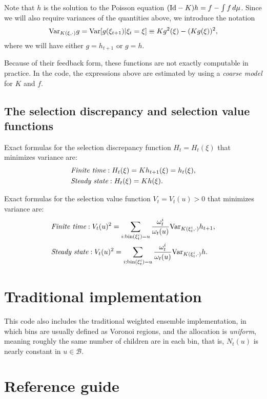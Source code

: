 \documentclass[11pt,letterpaper]{amsart}
\theoremstyle{plain}
\theoremstyle{definition}
\numberwithin{equation}{section}
\begin{document}
Note 
that $h$ is the solution to the Poisson equation $(\textup{Id} -K)h = f - \int f\,d\mu$. Since we 
will also require variances of the quantities above, we 
introduce the notation
$$\textup{Var}_{K(\xi,\cdot)}g = \textup{Var}[g(\xi_{t+1})|\xi_t = \xi] \equiv Kg^2(\xi) - (Kg(\xi))^2,$$
where we will have either $g = h_{t+1}$ or $g = h$.

Because of their feedback form, these functions 
are not exactly computable in practice. 
In the code, the expressions above are estimated 
by using a {\em coarse model} for $K$ and $f$. 

\subsection{The selection discrepancy and selection value functions}

Exact formulas for the selection
discrepancy function $H_t = H_t(\xi)$ that minimizes variance are:
\begin{align*}
&\textup{\em Finite time}: H_t(\xi) = Kh_{t+1}(\xi) = h_t(\xi),\\
&\textup{\em Steady state}: H_t(\xi) = Kh(\xi).
\end{align*}

Exact formulas for the selection
value function $V_t = V_t(u)>0$ that minimizes variance are:
\begin{align*}
&\textup{\em Finite time}: V_t(u)^2 = \sum_{i:\textup{bin}(\xi_t^i) = u} \frac{\omega_t^i}{\omega_t(u)} \textup{Var}_{K(\xi_t^i,\cdot)}h_{t+1},\\
&\textup{\em Steady state}: V_t(u)^2 = \sum_{i:\textup{bin}(\xi_t^i) = u} \frac{\omega_t^i}{\omega_t(u)} \textup{Var}_{K(\xi_t^i,\cdot)}h.
\end{align*}

\section{Traditional implementation}

This code also includes the traditional 
weighted ensemble implementation, in 
which bins 
are usually defined as Voronoi regions, 
and the allocation is {\em uniform}, 
meaning roughly the same number of children 
are in each bin, that is, $N_t(u)$ is nearly 
constant in $u \in {\mathcal B}$.


\section{Reference guide}
\end{document}
